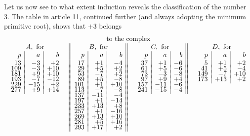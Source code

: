 \documentclass[twoside,12pt]{memoir}
\begin{document}
Let us now see to what extent induction reveals the classification of the number 3. The table in article 11, continued  further (and always adopting the minimum primitive root), shows that \(+3\) belongs
\[\begin{array}{cccc}
\multicolumn{4}{c}{\text{to the complex}}\\
\begin{array}[t]{r|r|r} 
\multicolumn{3}{c}{ A, \text{ for} }\\
p & a & b \\
13 & -3 & +2 \\[-4pt]
109 & -3 & +10 \\[-4pt]
181 & +9 & +10 \\[-4pt]
193 & -7 & -12 \\[-4pt]
229 & -15 & +2 \\[-4pt]
277 & +9 & +14 
\end{array} & 
\begin{array}[t]{||r|r|r||} 
\multicolumn{3}{||c||}{ B, \text{ for} }\\
p & a & b \\
17&+1&-4\\[-4pt]
29&+5&+2\\[-4pt]
53&-7&+2\\[-4pt]
89&+5&-8\\[-4pt]
101&+1&+10\\[-4pt]
113&-7&-8\\[-4pt]
137&-11&-4\\[-4pt]
197&+1&-14\\[-4pt]
233&+13&+8\\[-4pt]
257&+1&-16\\[-4pt]
269&+13&+10\\[-4pt]
281&+5&+16\\[-4pt]
293&+17&+2
\end{array}&
\begin{array}[t]{r|r|r||}
\multicolumn{3}{c||}{ C, \text{ for} }\\
p & a & b \\
37&+1&-6\\[-4pt]
61&+5&-6\\[-4pt]
73&-3&-8\\[-4pt]
97&+9&+4\\[-4pt]
157&-11&-6\\[-4pt] 
241&-15&-4 
\end{array}
&
\begin{array}[t]{r|r|r} 
\multicolumn{3}{c}{ D, \text{ for} }\\
p & a & b \\
5&+1&+2\\[-4pt]
41&+5&-4\\[-4pt]
149&-7&+10\\[-4pt]
173&+13&+2
\end{array}
\end{array}\]\pagebreak%
\end{document}
